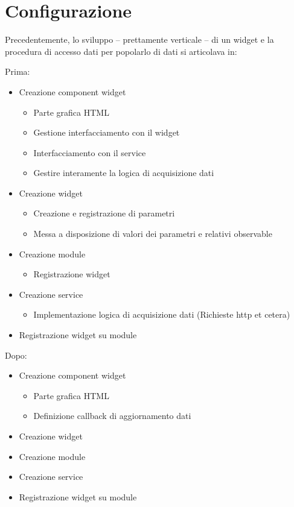 \FloatBarrier
\pagebreak
\section{Configurazione}
Precedentemente, lo sviluppo -- prettamente verticale -- di un widget e la procedura di accesso dati per popolarlo di dati si articolava in:

\begin{multicols}{2}
Prima:
\begin{itemize}
\item
Creazione component widget
\begin{itemize}
\item
Parte grafica HTML
\item
Gestione interfacciamento con il widget
\item
Interfacciamento con il service
\item
Gestire interamente la logica di acquisizione dati
\end{itemize}
\item
Creazione widget
\begin{itemize}
\item
Creazione e registrazione di parametri
\item
Messa a disposizione di valori dei parametri e relativi observable
\end{itemize}
\item
Creazione module
\begin{itemize}
\item
Registrazione widget
\end{itemize}
\item
Creazione service
\begin{itemize}
\item
Implementazione logica di acquisizione dati (Richieste http et cetera)
\end{itemize}
\item
Registrazione widget su module
\end{itemize}
\columnbreak

Dopo:
\begin{itemize}
\item
Creazione component widget
\begin{itemize}
\item
Parte grafica HTML
\item
Definizione callback di aggiornamento dati
\end{itemize}
\item
Creazione widget
\item
Creazione module
\item
Creazione service
\item
Registrazione widget su module
\end{itemize}

\end{multicols}



